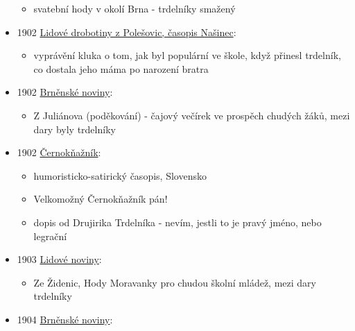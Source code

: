 \begin{itemize}
  \begin{itemize}
  \tightlist
  \item
    svatební hody v okolí Brna - trdelníky smažený
  \end{itemize}
\item
  1902
  \href{https://ceskadigitalniknihovna.cz/view/uuid:51ede477-8259-11e0-b92b-0050569d679d?page=uuid\%3A540811e9-8259-11e0-b92b-0050569d679d&fulltext=trdeln\%C3\%ADk\%20OR\%20trdeln\%C3\%ADky\%20OR\%20trdeln\%C3\%ADk\%C5\%AF&source=mzk}{Lidové
  drobotiny z Polešovic, časopis Našinec}:

  \begin{itemize}
  \tightlist
  \item
    vyprávění kluka o tom, jak byl populární ve škole, když přinesl
    trdelník, co dostala jeho máma po narození bratra
  \end{itemize}
\item
  1902
  \href{https://ceskadigitalniknihovna.cz/view/uuid:b0836ae0-7a03-11e3-ae4b-001018b5eb5c?page=uuid\%3A5bf570c0-7bd1-11e3-ae4b-001018b5eb5c&fulltext=trdeln\%C3\%ADk\%20OR\%20trdeln\%C3\%ADky\%20OR\%20trdeln\%C3\%ADk\%C5\%AF&source=mzk}{Brněnské
  noviny}:

  \begin{itemize}
  \tightlist
  \item
    Z Juliánova (poděkování) - čajový večírek ve prospěch chudých žáků,
    mezi dary byly trdelníky
  \end{itemize}
\item
  1902
  \href{https://dikda.snk.sk/uuid/uuid:58996fdb-67e7-405a-a594-2f58269ee2bf}{Černokňažník}:

  \begin{itemize}
  \tightlist
  \item
    humoristicko-satirický časopis, Slovensko
  \item
    Velkomožný Černokňažník pán!
  \item
    dopis od Drujirika Trdelníka - nevím, jestli to je pravý jméno, nebo
    legrační
  \end{itemize}
\item
  1903
  \href{https://www.digitalniknihovna.cz/vkol/uuid/uuid:b799eafc-435d-11dd-b505-00145e5790ea}{Lidové
  noviny}:

  \begin{itemize}
  \tightlist
  \item
    Ze Židenic, Hody Moravanky pro chudou školní mládež, mezi dary
    trdelníky
  \end{itemize}
\item
  1904
  \href{https://ceskadigitalniknihovna.cz/view/uuid:62df2c30-8367-11e3-a606-005056827e51?page=uuid\%3A3bd12fb0-86e3-11e3-b6b2-005056822549&fulltext=trdeln\%C3\%ADk\%20OR\%20trdeln\%C3\%ADky\%20OR\%20trdeln\%C3\%ADk\%C5\%AF&source=mzk}{Brněnské
  noviny}:


\end{itemize}
